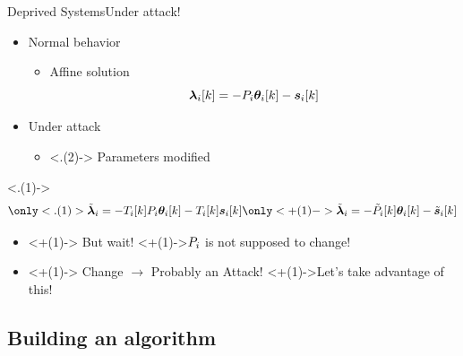 \documentclass[aspectratio=169]{beamer}
\begin{document}
\begin{frame}{Deprived Systems}{Under attack!}
  \begin{minipage}[t]{.45\linewidth}
    \begin{itemize}[<+->]
      \item Normal behavior
            \begin{itemize}
              \item Affine solution
                    \begin{equation*}
                      \lambdaik=-\Plin\thetaik-\sik
                    \end{equation*}
            \end{itemize}
    \end{itemize}
  \end{minipage}
  \hfill
  \begin{minipage}[t]{.45\linewidth}
    \begin{itemize}
      \item<+-> Under attack \onslide<+->{$\to$ $\lambdaicheat=\Tik\lambdai$}
            \begin{itemize}
              \item<.(2)-> Parameters modified
            \end{itemize}
    \end{itemize}
    \only<.(1)->{
      \begin{equation*}
        \only<.(1)>{\lambdaicheat=-\Tik\Plin\thetaik-\Tik\sik}
        \only<+(1)->{\lambdaicheat=-\Plintilde\thetaik-\siktilde}
      \end{equation*}
    }
  \end{minipage}
  \centering
  \begin{itemize}
    \item<+(1)-> But wait! \onslide<+(1)->{${P}_{i}$ is not supposed to change!}
    \item<+(1)-> Change $\to$ Probably an Attack! \onslide<+(1)->{Let's take advantage of this!}
  \end{itemize}
\end{frame}

\subsection{Building an algorithm}
\end{document}
